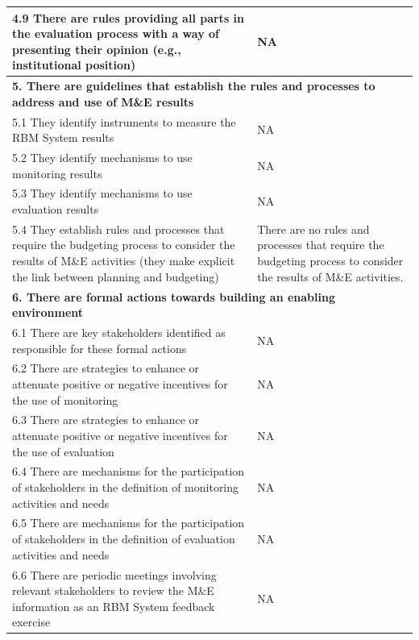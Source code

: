 \documentclass[
  10pt,
]{book}
\begin{document}
\begin{table}
\begin{tabular}[t]{l|l}
\hline
\hspace{1em}4.9 There are rules providing all parts in the evaluation process with a way of presenting their opinion (e.g., institutional position) & NA\\
\hline
\multicolumn{2}{l}{\textbf{5. There are guidelines that establish the rules and processes to address and use of M\&E results}}\\
\hline
\hspace{1em}5.1 They identify instruments to measure the RBM System results & NA\\
\hline
\hspace{1em}5.2 They identify mechanisms to use monitoring results & NA\\
\hline
\hspace{1em}5.3 They identify mechanisms to use evaluation results & NA\\
\hline
\hspace{1em}5.4 They establish rules and processes that require the budgeting process to consider the results of M\&E activities (they make explicit the link between planning and budgeting) & There are no rules and processes that require the budgeting process to consider the results of M\&E activities.\\
\hline
\multicolumn{2}{l}{\textbf{6. There are formal actions towards building an enabling environment}}\\
\hline
\hspace{1em}6.1 There are key stakeholders identified as responsible for these formal actions & NA\\
\hline
\hspace{1em}6.2 There are strategies to enhance or attenuate positive or negative incentives for the use of monitoring & NA\\
\hline
\hspace{1em}6.3 There are strategies to enhance or attenuate positive or negative incentives for the use of evaluation & NA\\
\hline
\hspace{1em}6.4 There are mechanisms for the participation of stakeholders in the definition of monitoring activities and needs & NA\\
\hline
\hspace{1em}6.5 There are mechanisms for the participation of stakeholders in the definition of evaluation activities and needs & NA\\
\hline
\hspace{1em}6.6 There are periodic meetings involving relevant stakeholders to review the M\&E information as an RBM System feedback exercise & NA\\

\end{tabular}
\end{table}
\end{document}

